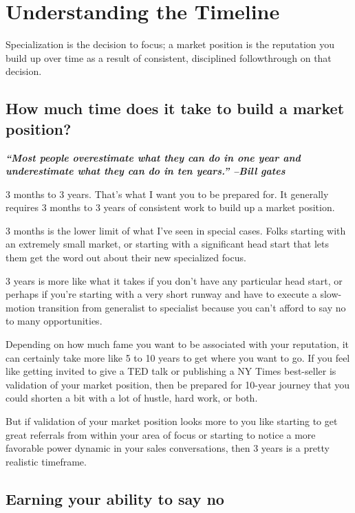 \chapter{Understanding the Timeline}

Specialization is the decision to focus; a market position is the reputation you build up over time as a result of consistent, disciplined followthrough on that decision.

\section{How much time does it take to build a market position?}

\textbf{\emph{``Most people overestimate what they can do in one year and underestimate what they can do in ten years.'' --Bill gates}}

3 months to 3 years. That's what I want you to be prepared for. It generally requires 3 months to 3 years of consistent work to build up a market position.

3 months is the lower limit of what I've seen in special cases. Folks starting with an extremely small market, or starting with a significant head start that lets them get the word out about their new specialized focus.

3 years is more like what it takes if you don't have any particular head start, or perhaps if you're starting with a very short runway and have to execute a slow-motion transition from generalist to specialist because you can't afford to say no to many opportunities.

Depending on how much fame you want to be associated with your reputation, it can certainly take more like 5 to 10 years to get where you want to go. If you feel like getting invited to give a TED talk or publishing a NY Times best-seller is validation of your market position, then be prepared for 10-year journey that you could shorten a bit with a lot of hustle, hard work, or both.

But if validation of your market position looks more to you like starting to get great referrals from within your area of focus or starting to notice a more favorable power dynamic in your sales conversations, then 3 years is a pretty realistic timeframe.

\section{Earning your ability to say no}

